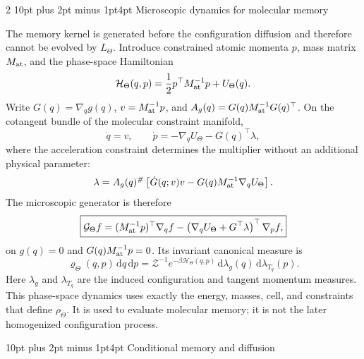 \documentclass[10pt]{article}
\makeatletter
\renewcommand\section{\@startsection{section}{1}{0pt}%
  {10pt plus 2pt minus 1pt}{4pt}%
  {\large\sffamily\bfseries\color{lithioxfontgreen}}}
\newcommand{\dd}{\,\mathrm d}
\newcommand{\pinv}{^{\#}}
\makeatother
\begin{document}
\begin{multicols}{2}
\section{Microscopic dynamics for molecular memory}

The memory kernel is generated before the configuration diffusion and therefore
cannot be evolved by \(L_\Theta\).  Introduce constrained atomic momenta \(p\), mass
matrix \(M_{\rm at}\), and the phase-space Hamiltonian
\[
\mathcal H_\Theta(q,p)=
\frac12p^\top M_{\rm at}^{-1}p+U_\Theta(q).
\]
Write \(G(q)=\nabla_qg(q)\), \(v=M_{\rm at}^{-1}p\), and
\(A_g(q)=G(q)M_{\rm at}^{-1}G(q)^\top\).  On the cotangent bundle of the
molecular constraint manifold,
\[
\dot q=v,\qquad
\dot p=-\nabla_qU_\Theta-G(q)^\top\lambda,
\]
where the acceleration constraint determines the multiplier without an additional
physical parameter:
\[
\lambda=A_g(q)\pinv
\left[\dot G(q;v)v-G(q)M_{\rm at}^{-1}\nabla_qU_\Theta\right].
\]
The microscopic generator is therefore
\[
\boxed{
\mathcal G_\Theta f=
(M_{\rm at}^{-1}p)^\top\nabla_q f
-\left(\nabla_qU_\Theta+G^\top\lambda\right)^\top\nabla_p f,}
\]
on \(g(q)=0\) and \(G(q)M_{\rm at}^{-1}p=0\).  Its invariant canonical measure is
\[
\boxed{
\varrho_\Theta(q,p)\dd q\dd p=
\mathcal Z^{-1}e^{-\beta\mathcal H_\Theta(q,p)}
\dd\lambda_g(q)\dd\lambda_{T_q}(p).}
\]
Here \(\lambda_g\) and \(\lambda_{T_q}\) are the induced configuration and tangent
momentum measures.  This phase-space dynamics uses exactly the energy, masses,
cell, and constraints that define \(\rho_\Theta\).  It is used to evaluate molecular
memory; it is not the later homogenized configuration process.

\section{Conditional memory and diffusion}


\end{multicols}
\end{document}
